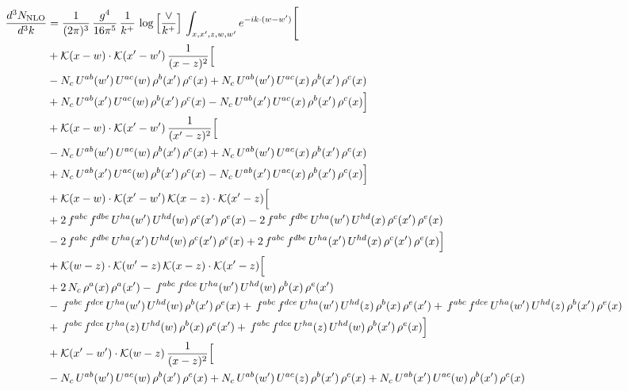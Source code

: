 \documentclass[9pt]{article}
\numberwithin{equation}{section}
\begin{document}
\begin{align}
\frac{d^{3}N_{\mathrm{NLO}}}{d^{3}k} & = \frac{1}{(2\pi)^{3}}\,\frac{g^{4}}{16\pi^{5}}\,\frac{1}{k^{+}}\,\log\Big[\frac{\vee}{k^{+}}\Big]\,\int_{x,x',z,w,w'}e^{-ik\cdot (w-w')}\Bigg[ \notag\\
& +\mathcal{K}(x-w)\cdot\mathcal{K}(x'-w')\,\frac{1}{(x-z)^{2}}\Big[\notag\\
& -N_{c}\,U^{ab}(w')\,U^{ac}(w)\,\rho^{b}(x')\,\rho^{c}(x) +N_{c}\,U^{ab}(w')\,U^{ac}(x)\,\rho^{b}(x')\,\rho^{c}(x)\notag\\
& +N_{c}\,U^{ab}(x')\,U^{ac}(w)\,\rho^{b}(x')\,\rho^{c}(x) -N_{c}\,U^{ab}(x')\,U^{ac}(x)\,\rho^{b}(x')\,\rho^{c}(x)\Big]\notag\\
& +\mathcal{K}(x-w)\cdot\mathcal{K}(x'-w')\,\frac{1}{(x'-z)^{2}}\Big[\notag\\
& -N_{c}\,U^{ab}(w')\,U^{ac}(w)\,\rho^{b}(x')\,\rho^{c}(x) +N_{c}\,U^{ab}(w')\,U^{ac}(x)\,\rho^{b}(x')\,\rho^{c}(x)\notag\\
& +N_{c}\,U^{ab}(x')\,U^{ac}(w)\,\rho^{b}(x')\,\rho^{c}(x) -N_{c}\,U^{ab}(x')\,U^{ac}(x)\,\rho^{b}(x')\,\rho^{c}(x)\Big]\notag\\
& +\mathcal{K}(x-w)\cdot\mathcal{K}(x'-w')\,\mathcal{K}(x-z)\cdot\mathcal{K}(x'-z)\Big[\notag\\
& +2\,f^{abc}\,f^{dbe}\,U^{ha}(w')\,U^{hd}(w)\,\rho^{c}(x')\,\rho^{e}(x) -2\,f^{abc}\,f^{dbe}\,U^{ha}(w')\,U^{hd}(x)\,\rho^{c}(x')\,\rho^{e}(x)\notag\\
& -2\,f^{abc}\,f^{dbe}\,U^{ha}(x')\,U^{hd}(w)\,\rho^{c}(x')\,\rho^{e}(x) +2\,f^{abc}\,f^{dbe}\,U^{ha}(x')\,U^{hd}(x)\,\rho^{c}(x')\,\rho^{e}(x)\Big]\notag\\
& +\mathcal{K}(w-z)\cdot\mathcal{K}(w'-z)\,\mathcal{K}(x-z)\cdot\mathcal{K}(x'-z)\Big[\notag\\
& +2\,N_{c}\,\rho^{a}(x)\,\rho^{a}(x') -\,f^{abc}\,f^{dce}\,U^{ha}(w')\,U^{hd}(w)\,\rho^{b}(x)\,\rho^{e}(x')\notag\\
& -\,f^{abc}\,f^{dce}\,U^{ha}(w')\,U^{hd}(w)\,\rho^{b}(x')\,\rho^{e}(x) +\,f^{abc}\,f^{dce}\,U^{ha}(w')\,U^{hd}(z)\,\rho^{b}(x)\,\rho^{e}(x') +\,f^{abc}\,f^{dce}\,U^{ha}(w')\,U^{hd}(z)\,\rho^{b}(x')\,\rho^{e}(x)\notag\\
& +\,f^{abc}\,f^{dce}\,U^{ha}(z)\,U^{hd}(w)\,\rho^{b}(x)\,\rho^{e}(x') +\,f^{abc}\,f^{dce}\,U^{ha}(z)\,U^{hd}(w)\,\rho^{b}(x')\,\rho^{e}(x)\Big]\notag\\
& +\mathcal{K}(x'-w')\cdot\mathcal{K}(w-z)\,\frac{1}{(x-z)^{2}}\Big[\notag\\
& -N_{c}\,U^{ab}(w')\,U^{ac}(w)\,\rho^{b}(x')\,\rho^{c}(x) +N_{c}\,U^{ab}(w')\,U^{ac}(z)\,\rho^{b}(x')\,\rho^{c}(x) +N_{c}\,U^{ab}(x')\,U^{ac}(w)\,\rho^{b}(x')\,\rho^{c}(x)\notag\\

\end{align}
\end{document}
